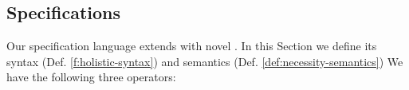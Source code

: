 




\subsection {\Nec Specifications}
\label{s:holistic-guarantees}

Our \Nec specification language extends \SpecO with novel 
.
In this Section we define its syntax (Def. \ref{f:holistic-syntax}) and semantics 
(Def. \ref{def:necessity-semantics})
We have the following three operators:

